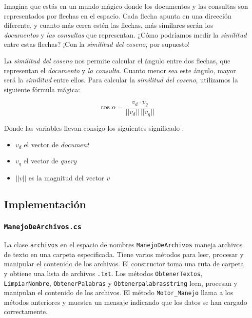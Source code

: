 \documentclass[a4paper, 12pt]{report}
\begin{document}
Imagina que estás en un mundo mágico donde los documentos y las consultas son representados por flechas en el espacio.
 Cada flecha apunta en una dirección diferente, y cuanto más cerca estén las flechas, más similares serán los {\it documentos} y {\it las consultas} que representan.
 ¿Cómo podríamos medir la {\it similitud} entre estas flechas? ¡Con la{ \it similitud del coseno}, por supuesto!

La {\it similitud del coseno} nos permite calcular el ángulo entre dos flechas, que representan el {\it documento} y {\it la consulta}.
 Cuanto menor sea este ángulo, mayor será la {\it similitud} entre ellos. Para calcular la {\it similitud del coseno}, utilizamos la siguiente fórmula mágica:

\begin{equation}
	\cos \alpha = \frac{v_d \cdot v_q}{||v_d|| ~ ||v_q||}
\end{equation}

Donde las variables llevan consigo los siguientes significado :

\begin{itemize}
	\item $v_d$ el vector de {\it document}
	\item $v_q$ el vector de {\it query}
	\item $||v||$ es la magnitud del vector $v$
\end{itemize}

\subsection*{Implementación}

\subsubsection*{\tt ManejoDeArchivos.cs}

La clase \texttt{archivos} en el espacio de nombres \texttt{ManejoDeArchivos} maneja archivos de texto en una carpeta especificada.
 Tiene varios métodos para leer, procesar y manipular el contenido de los archivos.
 El constructor toma una ruta de carpeta y obtiene una lista de archivos \texttt{.txt}.
 Los métodos \texttt{ObtenerTextos}, \texttt{LimpiarNombre}, \texttt{ObtenerPalabras} y \texttt{Obtenerpalabrasstring} leen, procesan y manipulan el contenido de los archivos.
 El método \texttt{Motor\_Manejo} llama a los métodos anteriores y muestra un mensaje indicando que los datos se han cargado correctamente.
\end{document}
